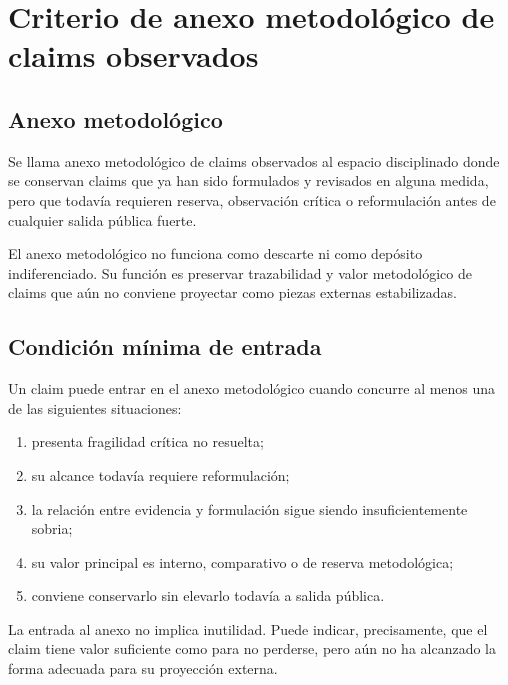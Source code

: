 \chapter{Criterio de anexo metodológico de claims observados}

\section{Anexo metodológico}
\begin{definition}
Se llama anexo metodológico de claims observados al espacio disciplinado donde se conservan claims que ya han sido formulados y revisados en alguna medida, pero que todavía requieren reserva, observación crítica o reformulación antes de cualquier salida pública fuerte.
\end{definition}

\begin{observation}
El anexo metodológico no funciona como descarte ni como depósito indiferenciado. Su función es preservar trazabilidad y valor metodológico de claims que aún no conviene proyectar como piezas externas estabilizadas.
\end{observation}

\section{Condición mínima de entrada}
\begin{definition}
Un claim puede entrar en el anexo metodológico cuando concurre al menos una de las siguientes situaciones:
\begin{enumerate}
  \item presenta fragilidad crítica no resuelta;
  \item su alcance todavía requiere reformulación;
  \item la relación entre evidencia y formulación sigue siendo insuficientemente sobria;
  \item su valor principal es interno, comparativo o de reserva metodológica;
  \item conviene conservarlo sin elevarlo todavía a salida pública.
\end{enumerate}
\end{definition}

\begin{observation}
La entrada al anexo no implica inutilidad. Puede indicar, precisamente, que el claim tiene valor suficiente como para no perderse, pero aún no ha alcanzado la forma adecuada para su proyección externa.
\end{observation}

